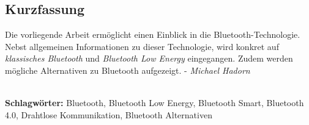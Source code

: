 
\subsection*{Kurzfassung}
Die vorliegende Arbeit ermöglicht einen Einblick in die Bluetooth-Technologie.
Nebst allgemeinen Informationen zu dieser Technologie, wird konkret auf \textit{klassisches Bluetooth} und \textit{Bluetooth Low Energy} eingegangen.
Zudem werden mögliche Alternativen zu Bluetooth aufgezeigt.
 - \textit{Michael Hadorn}


%
\mbox{}\\[0.5\baselineskip]\noindent
\textbf{Schlagwörter:} 
Bluetooth, Bluetooth Low Energy, Bluetooth Smart, Bluetooth 4.0, Drahtlose Kommunikation, Bluetooth Alternativen
